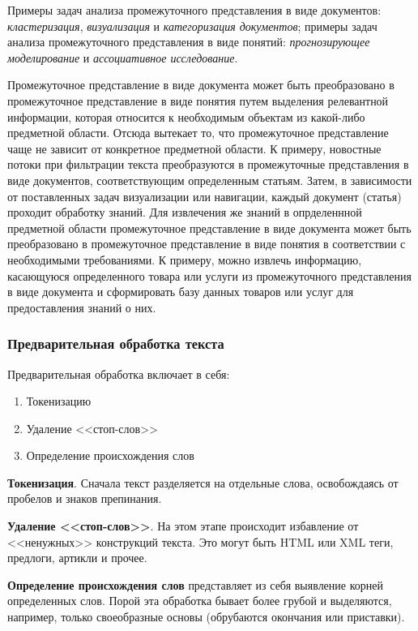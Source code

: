\documentclass[14pt]{matmex-diploma-custom}
\begin{document}
Примеры задач анализа промежуточного представления в виде документов: \emph{кластеризация}, \emph{визуализация} и \emph{категоризация документов}; примеры задач анализа промежуточного представления в виде понятий: \emph{прогнозирующее моделирование} и \emph{ассоциативное исследование}.

Промежуточное представление в виде документа может быть преобразовано в промежуточное представление в виде понятия путем выделения релевантной информации, которая относится к необходимым объектам из какой-либо предметной области. Отсюда вытекает то, что промежуточное представление чаще не зависит от конкретное предметной области. К примеру, новостные потоки при фильтрации текста преобразуются в промежуточные представления в виде документов, соответствующим определенным статьям. Затем, в зависимости от поставленных задач визуализации или навигации, каждый документ (статья) проходит обработку знаний. Для извлечения же знаний в опрделеннной предметной области промежуточное представление в виде документа может быть преобразовано в промежуточное представление в виде понятия в соответствии с необходимыми требованиями. К примеру, можно извлечь информацию, касающуюся определенного товара или услуги из промежуточного представления в виде документа и сформировать базу данных товаров или услуг для предоставления знаний о них.

\subsubsection{Предварительная обработка текста}

Предварительная обработка включает в себя:

\begin{enumerate}
\item Токенизацию
\item Удаление <<стоп-слов>>
\item Определение происхождения слов
\end{enumerate}

\textbf{Токенизация}. Сначала текст разделяется на отдельные слова, освобождаясь от пробелов и знаков препинания.

\textbf{Удаление <<стоп-слов>>}. На этом этапе происходит избавление от <<ненужных>> конструкций текста. Это могут быть HTML или XML теги, предлоги, артикли и прочее.

\textbf{Определение происхождения слов} представляет из себя выявление корней определенных слов. Порой эта обработка бывает более грубой и выделяются, например, только своеобразные основы (обрубаются окончания или приставки).
\end{document}
